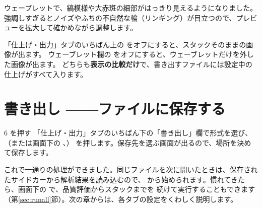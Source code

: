 \medskip
ウェーブレットで、縞模様や大赤斑の細部がはっきり見えるようになりました。
強調しすぎるとノイズやふちの不自然な輪（リンギング）が目立つので、プレビューを拡大して確かめながら調整します。

\begin{tip}
  「仕上げ・出力」タブのいちばん上の  をオフにすると、スタックそのままの画像が出ます。
  ウェーブレット欄の  をオフにすると、ウェーブレットだけを外した画像が出ます。
  どちらも\textbf{表示の比較だけ}で、書き出すファイルには設定中の仕上げがすべて入ります。
\end{tip}

\section{書き出し ——ファイルに保存する}\label{sec:qs-export}

\begin{step}{6}{ を押す}
  「仕上げ・出力」タブのいちばん下の「書き出し」欄で形式を選び、（または画面下の 、）
  を押します。保存先を選ぶ画面が出るので、場所を決めて保存します。
\end{step}


\begin{point}[おつかれさまでした]
  これで一通りの処理ができました。同じファイルを次に開いたときは、保存されたサイドカーから解析結果を読み込むので、
   から始められます。慣れてきたら、画面下の  で、品質評価からスタックまでを
  続けて実行することもできます（第\ref{sec:runall}節）。次の章からは、各タブの設定をくわしく説明します。
\end{point}
